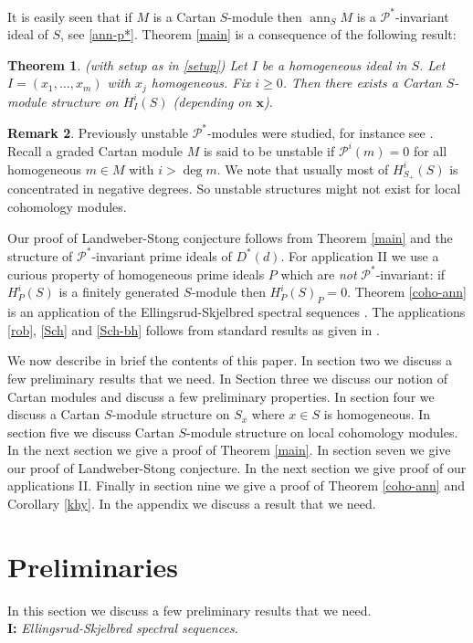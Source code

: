 \documentclass{amsart}
\newcommand{\xb}{\mathbf{x} }
\newcommand{\Pc}{\mathcal{P} }
\newcommand{\ann}{\operatorname{ann}}
\theoremstyle{plain}
\newtheorem{theorem}{Theorem}[section]
\theoremstyle{definition}
\newtheorem{remark}[theorem]{Remark}
\theoremstyle{remark}
\begin{document}
 It is easily seen that if $M$ is a Cartan $S$-module then $\ann_S M$ is a $\Pc^*$-invariant ideal of $S$, see \ref{ann-p*}. Theorem \ref{main} is a consequence of the following result:
\begin{theorem}\label{chief-intro}
(with setup as in \ref{setup}) Let $I$ be a homogeneous ideal in $S$. Let $I = (x_1, \ldots, x_m)$ with $x_j$ homogeneous. Fix $i \geq 0$. Then there exists a Cartan $S$-module structure on $H^i_I(S)$ (depending on $\xb$).
\end{theorem}

\begin{remark}
Previously unstable $\Pc^*$-modules were studied, for instance see \cite[8.5]{NS}. Recall a graded Cartan module $M$ is said to be unstable if $\Pc^i(m) = 0$ for all homogeneous $m \in M$ with $i > \deg m$.  We note that usually most of $H^i_{S_+}(S)$ is concentrated in negative degrees. So unstable structures might not exist  for local cohomology modules.
\end{remark}


Our proof of Landweber-Stong conjecture follows from Theorem \ref{main} and  the structure of $\Pc^*$-invariant prime  ideals of $D^*(d)$. For application II we use a curious property of homogeneous prime ideals $P$ which are \textit{not} $\Pc^*$-invariant: if $H^i_P(S)$ is a finitely generated $S$-module then $H^i_P(S)_P = 0$. Theorem \ref{coho-ann} is an application of the Ellingsrud-Skjelbred spectral sequences \cite{ES}. The applications \ref{rob}, \ref{Sch} and \ref{Sch-bh} follows from standard results as given in \cite[Chapter 8]{BH}.



We now describe in brief the contents of this paper.  In section two we discuss a few preliminary results that we need. In Section three we discuss our notion of Cartan modules and discuss a few preliminary properties. In section four we discuss a Cartan $S$-module structure on $S_x$ where $x \in S$ is homogeneous.  In section five we discuss Cartan $S$-module structure on local cohomology modules.   In the next section we give a proof of Theorem \ref{main}. In section seven we give our proof of Landweber-Stong conjecture. In the next section we give proof of our applications II. Finally in section nine we give a proof of Theorem \ref{coho-ann} and Corollary \ref{khy}.
In the appendix we discuss a result that we need.
\section{Preliminaries}
In this section we discuss a few preliminary results that we need. \\
\textbf{I:} \emph{Ellingsrud-Skjelbred spectral sequences.}
\end{document}
